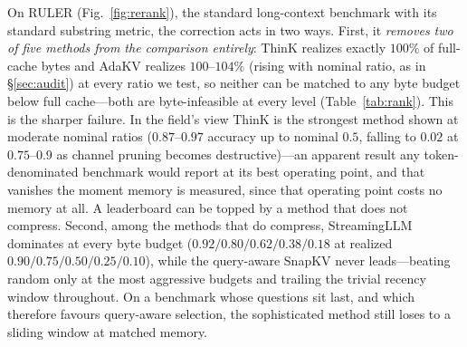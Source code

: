\documentclass[11pt]{article}
\begin{document}
On RULER (Fig.~\ref{fig:rerank}), the standard long-context benchmark with its standard substring
metric, the correction acts in two ways. First, it \emph{removes two of five methods from the
comparison entirely}: ThinK realizes exactly $100\%$ of full-cache bytes and AdaKV realizes
$100$--$104\%$ (rising with nominal ratio, as in \S\ref{sec:audit}) at every ratio we test, so
neither can be matched to any byte budget below full cache---both are byte-infeasible at every level
(Table~\ref{tab:rank}). This is the sharper failure. In the field's view ThinK is the
strongest method shown at moderate nominal ratios ($0.87$--$0.97$ accuracy up to nominal $0.5$,
falling to $0.02$ at $0.75$--$0.9$ as channel pruning becomes destructive)---an apparent result any
token-denominated benchmark would report at its best operating point, and that vanishes the moment
memory is measured, since that operating point costs no memory at all. A leaderboard can be topped
by a method that does not compress. Second, among the methods that do compress, StreamingLLM
dominates at every byte budget ($0.92/0.80/0.62/0.38/0.18$ at realized $0.90/0.75/0.50/0.25/0.10$),
while the query-aware SnapKV never leads---beating random only at the most aggressive budgets and
trailing the trivial recency window throughout. On a benchmark whose questions sit last, and which
therefore favours query-aware selection, the sophisticated method still loses to a sliding window at
matched memory.

\begin{table}[t]
  \centering
  \caption{Per budget level, the Kendall $\tau$ between the ranking at matched nominal ratio and at
  the realized byte budget that ratio is assumed to deliver, and the methods that are
  \emph{byte-infeasible}---unable to reach that byte budget at any nominal ratio. On Qwen2.5-3B,
  $\tau=1$ among the compressing methods (byte-matching does not reorder them), but AdaKV and ThinK
  are byte-infeasible at every level: they report compression the byte axis cannot honour.
  Auto-generated by \texttt{scripts/table1\_rank.py}.}
  \label{tab:rank}
\end{table}
\end{document}
